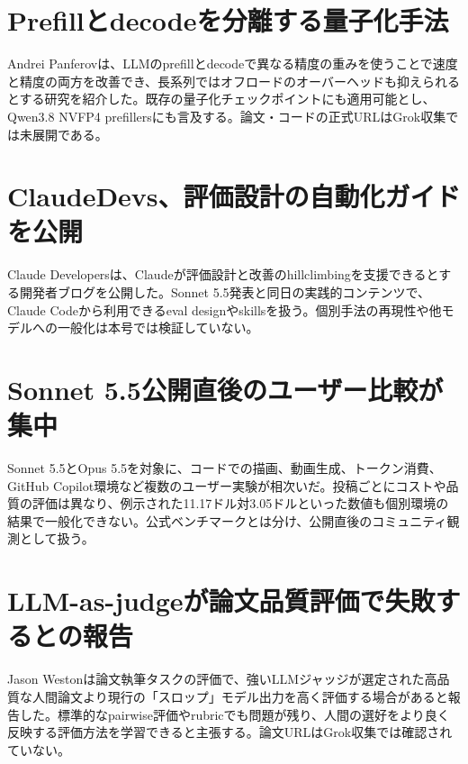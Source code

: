 \section{Prefillとdecodeを分離する量子化手法}
Andrei Panferovは、LLMのprefillとdecodeで異なる精度の重みを使うことで速度と精度の両方を改善でき、長系列ではオフロードのオーバーヘッドも抑えられるとする研究を紹介した。既存の量子化チェックポイントにも適用可能とし、Qwen3.8 NVFP4 prefillersにも言及する。論文・コードの正式URLはGrok収集では未展開である。

\section{ClaudeDevs、評価設計の自動化ガイドを公開}
Claude Developersは、Claudeが評価設計と改善のhillclimbingを支援できるとする開発者ブログを公開した。Sonnet 5.5発表と同日の実践的コンテンツで、Claude Codeから利用できるeval designやskillsを扱う。個別手法の再現性や他モデルへの一般化は本号では検証していない。

\section{Sonnet 5.5公開直後のユーザー比較が集中}
Sonnet 5.5とOpus 5.5を対象に、コードでの描画、動画生成、トークン消費、GitHub Copilot環境など複数のユーザー実験が相次いだ。投稿ごとにコストや品質の評価は異なり、例示された11.17ドル対3.05ドルといった数値も個別環境の結果で一般化できない。公式ベンチマークとは分け、公開直後のコミュニティ観測として扱う。

\section{LLM-as-judgeが論文品質評価で失敗するとの報告}
Jason Westonは論文執筆タスクの評価で、強いLLMジャッジが選定された高品質な人間論文より現行の「スロップ」モデル出力を高く評価する場合があると報告した。標準的なpairwise評価やrubricでも問題が残り、人間の選好をより良く反映する評価方法を学習できると主張する。論文URLはGrok収集では確認されていない。

